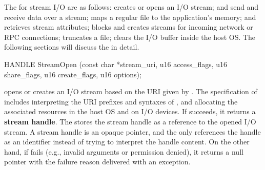 The \hostapis{} for stream I/O are as follows:
 creates or opens an I/O stream;
 and 
send and receive data over a stream;
 maps %
a regular file to the application's memory; %
 and 
retrieves stream attributes;
 blocks and creates streams for incoming network or RPC connections;
 truncates a file;
 clears the I/O buffer inside the host OS.
The following sections will discuss the \hostapis{} in detail.









\begin{paldef}
HANDLE StreamOpen (const char *stream_uri,
                   u16 access_flags, u16 share_flags,
                   u16 create_flags, u16 options);
\end{paldef}



 opens or creates an I/O stream %
based on the URI given by . %
The specification of 
 includes interpreting the URI prefixes and syntaxes of ,
and allocating the associated resources in the host OS and on I/O devices.
If  succeeds, it returns a {\bf stream handle}.
The \libos{} stores the stream handle as a reference to the opened I/O stream.
A stream handle is an opaque pointer, and the \libos{} only references the handle as an identifier instead of trying to interpret the handle content.
On the other hand, if  fails (e.g., invalid arguments or permission denied), it returns a null pointer with the failure reason delivered with an exception.



